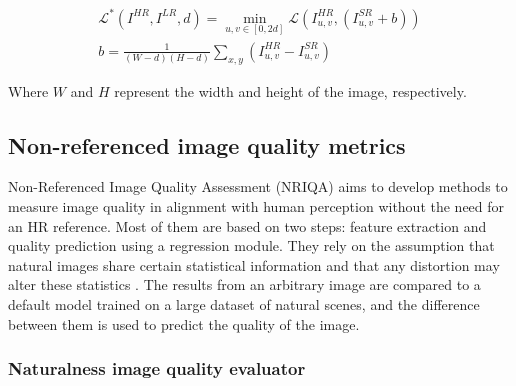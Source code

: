             \begin{equation}
                \begin{aligned}
                    \mathcal{L}^* ( I^{HR}, I^{LR}, d) = \min_{u,v \in [0,2d]} \mathcal{L} ( I^{HR}_{u,v}, (I^{SR}_{u,v}+b)) \\
                    b = \frac{1}{(W - d)(H - d)} \sum_{x,y} \left( I^{HR}_{u,v} - I^{SR}_{u,v} \right)
               \end{aligned}
            \end{equation}
    
            \noindent Where $W$ and $H$ represent the width and height of the image, respectively.
    

    \subsection{Non-referenced image quality metrics}

    Non-Referenced Image Quality Assessment (NRIQA) aims to develop methods to measure image quality in alignment with human perception without the need for an HR reference. 
    Most of them are based on two steps: feature extraction and quality prediction using a regression module. 
    They rely on the assumption that natural images share certain statistical information and that any distortion may alter these statistics \cite{niqe}.
    The results from an arbitrary image are compared to a default model trained on a large dataset of natural scenes, and the difference between them is used to predict the quality of the image.



        

        \subsubsection{Naturalness image quality evaluator}

